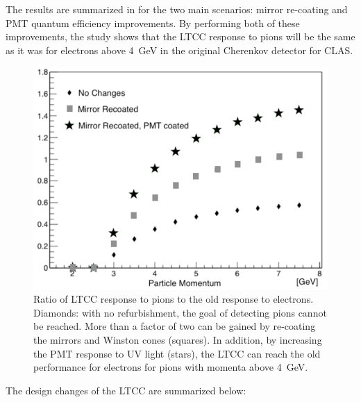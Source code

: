 The results are summarized in  for the two main scenarios: mirror re-coating and PMT quantum efficiency improvements.
By performing both of these improvements, the study shows that the LTCC response to pions will be the same as it was for electrons above 4~GeV
in the original Cherenkov detector for CLAS.

\begin{figure}
	\centering
	\includegraphics[width=0.99\columnwidth, height=0.7\columnwidth]{img/refurbishmentGains.png}
	\caption{Ratio of LTCC response to pions to the old response to electrons. Diamonds: with no refurbishment, the
          goal of detecting pions cannot be reached. More than a factor of two can be gained by re-coating the mirrors
          and Winston cones (squares). In addition, by increasing the PMT response to UV light (stars), the LTCC can
          reach the old performance for electrons for pions with momenta above 4~GeV.}
	\label{fig:refurbishmentGains}
\end{figure}

The design changes of the LTCC are summarized below:

